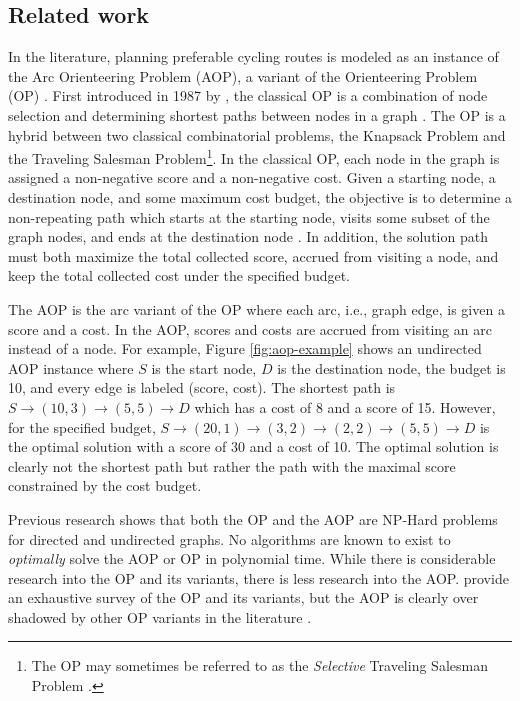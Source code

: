 \documentclass[honors]{union-cs-thesis}
\begin{document}
\subsection{Related work} \label{sec:relatedwork}
In the literature, planning preferable cycling routes is modeled as an instance of the Arc Orienteering Problem (AOP), a variant of the Orienteering Problem (OP) \cite{souffriau2011planning}. First introduced in 1987 by \citeauthor{golden1987orienteering}, the classical OP is a combination of node selection and determining shortest paths between nodes in a graph \cite{golden1987orienteering}. The OP is a hybrid between two classical combinatorial problems, the Knapsack Problem and the Traveling Salesman Problem\footnote{The OP may sometimes be referred to as the \emph{Selective} Traveling Salesman Problem \cite{laporte1990selective}.}. In the classical OP, each node in the graph is assigned a non-negative score and a non-negative cost. Given a starting node, a destination node, and some maximum cost budget, the objective is to determine a non-repeating path which starts at the starting node, visits some subset of the graph nodes, and ends at the destination node \cite{gunawan2016orienteering}. In addition, the solution path must both maximize the total collected score, accrued from visiting a node, and keep the total collected cost under the specified budget.

The AOP is the arc variant of the OP where each arc, i.e., graph edge, is given a score and a cost. In the AOP, scores and costs are accrued from visiting an arc instead of a node. For example, Figure \ref{fig:aop-example} shows an undirected AOP instance where $S$ is the start node, $D$ is the destination node, the budget is 10, and every edge is labeled (score, cost). The shortest path is $S \rightarrow (10,3) \rightarrow (5,5) \rightarrow D$ which has a cost of 8 and a score of 15. However, for the specified budget, $S \rightarrow (20,1) \rightarrow (3,2) \rightarrow (2,2) \rightarrow (5,5) \rightarrow D$ is the optimal solution with a score of 30 and a cost of 10. The optimal solution is clearly not the shortest path but rather the path with the maximal score constrained by the cost budget.

Previous research shows that both the OP and the AOP are NP-Hard problems for directed and undirected graphs. No algorithms are known to exist to \emph{optimally} solve the AOP or OP in polynomial time. While there is considerable research into the OP and its variants, there is less research into the AOP. \citeauthor{gunawan2016orienteering} provide an exhaustive survey of the OP and its variants, but the AOP is clearly over shadowed by other OP variants in the literature \cite{gunawan2016orienteering}.
\end{document}
